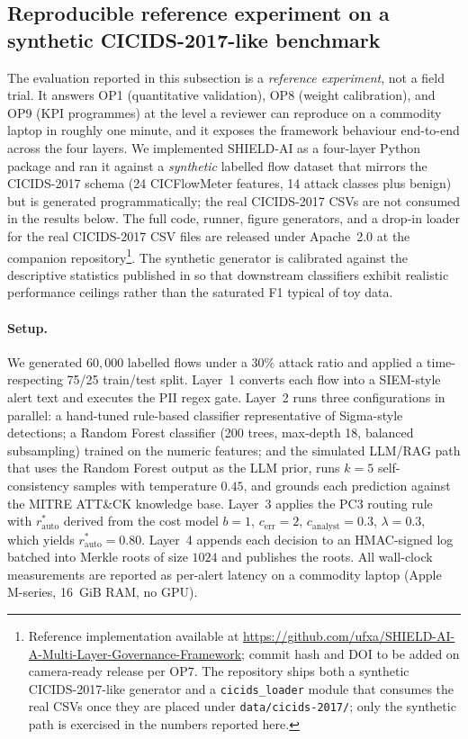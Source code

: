 \documentclass[preprint,12pt,authoryear]{elsarticle}
\begin{document}
\subsection{Reproducible reference experiment on a synthetic CICIDS-2017-like benchmark}
\label{ssec:empirical}
The evaluation reported in this subsection is a \emph{reference experiment}, not a field trial.  It answers OP1 (quantitative validation), OP8 (weight calibration), and OP9 (KPI programmes) at the level a reviewer can reproduce on a commodity laptop in roughly one minute, and it exposes the framework behaviour end-to-end across the four layers.  We implemented SHIELD-AI as a four-layer Python package and ran it against a \emph{synthetic} labelled flow dataset that mirrors the CICIDS-2017 schema (24 CICFlowMeter features, 14 attack classes plus benign) but is generated programmatically; the real CICIDS-2017 CSVs are not consumed in the results below.  The full code, runner, figure generators, and a drop-in loader for the real CICIDS-2017 CSV files are released under Apache~2.0 at the companion repository\footnote{Reference implementation available at \url{https://github.com/ufxa/SHIELD-AI-A-Multi-Layer-Governance-Framework}; commit hash and DOI to be added on camera-ready release per OP7.  The repository ships both a synthetic CICIDS-2017-like generator and a \texttt{cicids\_loader} module that consumes the real CSVs once they are placed under \texttt{data/cicids-2017/}; only the synthetic path is exercised in the numbers reported here.}.  The synthetic generator is calibrated against the descriptive statistics published in \citet{sharafaldin2018cicids} so that downstream classifiers exhibit realistic performance ceilings rather than the saturated F1 typical of toy data.

\paragraph{Setup.}
We generated $60{,}000$ labelled flows under a 30\% attack ratio and applied a time-respecting 75/25 train/test split.  Layer~1 converts each flow into a SIEM-style alert text and executes the PII regex gate.  Layer~2 runs three configurations in parallel: a hand-tuned rule-based classifier representative of Sigma-style detections; a Random Forest classifier (200 trees, max-depth 18, balanced subsampling) trained on the numeric features; and the simulated LLM/RAG path that uses the Random Forest output as the LLM prior, runs $k{=}5$ self-consistency samples with temperature $0.45$, and grounds each prediction against the MITRE ATT\&CK knowledge base.  Layer~3 applies the PC3 routing rule with $r^{*}_{\text{auto}}$ derived from the cost model $b{=}1$, $c_{\text{err}}{=}2$, $c_{\text{analyst}}{=}0.3$, $\lambda{=}0.3$, which yields $r^{*}_{\text{auto}}{=}0.80$.  Layer~4 appends each decision to an HMAC-signed log batched into Merkle roots of size $1024$ and publishes the roots.  All wall-clock measurements are reported as per-alert latency on a commodity laptop (Apple M-series, 16~GiB RAM, no GPU).
\end{document}
